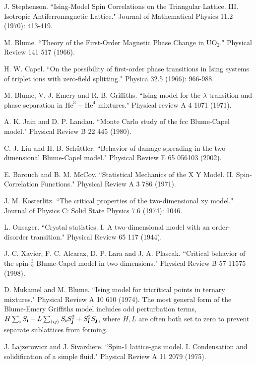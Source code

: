 \documentclass[pra,letterpaper,10pt,twocolumn]{revtex4}
\begin{document}
\begin{thebibliography}{100}
J. Stephenson. ``Ising‐Model Spin Correlations on the Triangular Lattice. III. Isotropic Antiferromagnetic Lattice." Journal of Mathematical Physics 11.2 (1970): 413-419.

M. Blume. ``Theory of the First-Order Magnetic Phase Change in U$\mathrm{O}_2$." Physical Review 141 517 (1966).

H. W. Capel. ``On the possibility of first-order phase transitions in Ising systems of triplet ions with zero-field splitting." Physica 32.5 (1966): 966-988.

M. Blume, V. J. Emery and R. B. Griffiths. ``Ising model for the $\ensuremath{\lambda}$ transition and phase separation in $\mathrm{He}^3-\mathrm{He}^4$ mixtures." Physical review A 4 1071 (1971).

A. K. Jain and D. P. Landau. ``Monte Carlo study of the fcc Blume-Capel model." Physical Review B 22 445 (1980).

C. J. Liu and H. B. Sch\"uttler. ``Behavior of damage spreading in the two-dimensional Blume-Capel model." Physical Review E 65 056103 (2002).

E. Barouch and B. M. McCoy. ``Statistical Mechanics of the X Y Model. II. Spin-Correlation Functions." Physical Review A 3 786 (1971).

J. M. Kosterlitz. ``The critical properties of the two-dimensional xy model." Journal of Physics C: Solid State Physics 7.6 (1974): 1046.

L. Onsager. ``Crystal statistics. I. A two-dimensional model with an order-disorder transition." Physical Review 65 117 (1944).

J. C. Xavier, F. C. Alcaraz, D. P. Lara and J. A. Plascak. ``Critical behavior of the spin-$\frac{3}{2}$ Blume-Capel model in two dimensions." Physical Review B 57 11575 (1998).

D. Mukamel and M. Blume. ``Ising model for tricritical points in ternary mixtures." Physical Review A 10 610 (1974). The most general form of the Blume-Emery Griffiths model includes odd
perturbation terms, $H\sum_{\bf i}S_{\bf i}+L\sum_{\langle ij \rangle} S_{\bf i} S_{\bf j}^2+S_{\bf i}^2S_{\bf j}$, where $H,L$ are often both set to zero to prevent separate sublattices from forming.

J. Lajzerowicz and J. Sivardiere. ``Spin-1 lattice-gas model. I. Condensation and solidification of a simple fluid." Physical Review A 11 2079 (1975).


\end{thebibliography}
\end{document}
